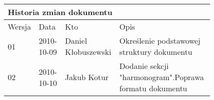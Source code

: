 \begin{figure}[h]
	\centering

\begin{tabular}{|p{}|p{}|p{}|p{}|}
	\hline
	\multicolumn{4}{|l|}{Historia zmian dokumentu} \\
	\hline
	Wersja & Data & Kto & Opis \\
	\hline
	01 & 2010-10-09 & Daniel Kłobuszewski &
	Określenie podstawowej struktury dokumentu \\
	\hline
	02 & 2010-10-10 & Jakub Kotur &
	Dodanie sekcji "harmonogram".\newline  Poprawa formatu dokumentu \\
	\hline
\end{tabular}

	\label{tab:metric}
\end{figure}

